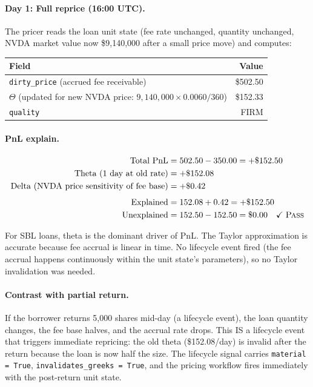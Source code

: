 \documentclass[11pt,a4paper]{article}
\begin{document}
\paragraph{Day 1: Full reprice (16:00 UTC).}  The pricer reads the loan unit state (fee rate unchanged, quantity unchanged, NVDA market value now \$9{,}140{,}000 after a small price move) and computes:
\begin{center}
\small
\begin{tabular}{l r}
\toprule
\textbf{Field} & \textbf{Value} \\
\midrule
\texttt{dirty\_price} (accrued fee receivable) & \$502.50 \\
$\Theta$ (updated for new NVDA price: $9{,}140{,}000 \times 0.0060/360$) & \$152.33 \\
\texttt{quality} & FIRM \\
\bottomrule
\end{tabular}
\end{center}

\paragraph{PnL explain.}
\begin{align*}
\text{Total PnL} &= 502.50 - 350.00 = +\$152.50 \\
\text{Theta (1 day at old rate)} &= +\$152.08 \\
\text{Delta (NVDA price sensitivity of fee base)} &= +\$0.42 \\[4pt]
\text{Explained} &= 152.08 + 0.42 = +\$152.50 \\
\text{Unexplained} &= 152.50 - 152.50 = \$0.00 \quad\checkmark\;\textsc{Pass}
\end{align*}

\noindent For SBL loans, theta is the dominant driver of PnL.  The Taylor approximation is accurate because fee accrual is linear in time.  No lifecycle event fired (the fee accrual happens continuously within the unit state's parameters), so no Taylor invalidation was needed.

\paragraph{Contrast with partial return.}  If the borrower returns 5{,}000 shares mid-day (a lifecycle event), the loan quantity changes, the fee base halves, and the accrual rate drops.  This IS a lifecycle event that triggers immediate repricing: the old theta (\$152.08/day) is invalid after the return because the loan is now half the size.  The lifecycle signal carries \texttt{material = True}, \texttt{invalidates\_greeks = True}, and the pricing workflow fires immediately with the post-return unit state.
\end{document}
